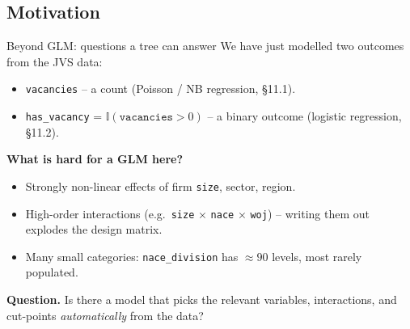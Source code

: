 \documentclass[10pt,ignorenonframetext,aspectratio=169]{beamer}
\begin{document}
\subsection{Motivation}

\begin{frame}{Beyond GLM: questions a tree can answer}
We have just modelled two outcomes from the JVS data:
\begin{itemize}
    \justifying
    \item \texttt{vacancies} -- a count (Poisson / NB regression, \S 11.1).
    \item \texttt{has\_vacancy} = $\mathbb{I}(\texttt{vacancies} > 0)$ -- a binary outcome (logistic regression, \S 11.2).
\end{itemize}

\medskip
\textbf{What is hard for a GLM here?}
\begin{itemize}
    \justifying
    \item Strongly non-linear effects of firm \texttt{size}, sector, region.
    \item High-order interactions (e.g.\ \texttt{size} $\times$ \texttt{nace} $\times$ \texttt{woj}) -- writing them out explodes the design matrix.
    \item Many small categories: \texttt{nace\_division} has $\approx 90$ levels, most rarely populated.
\end{itemize}

\medskip
\textbf{Question.} Is there a model that picks the relevant variables, interactions, and cut-points \emph{automatically} from the data?
\end{frame}
\end{document}
